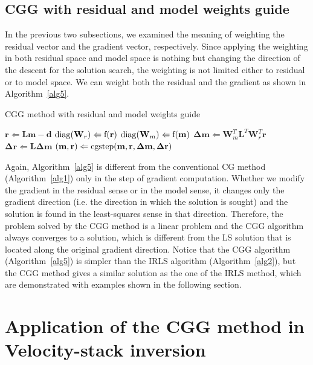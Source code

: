 \subsection{CGG with residual and model weights guide}
In the previous two subsections, we examined the meaning of weighting
the residual vector and the gradient vector, respectively.
Since applying the weighting in both residual space
and model space is nothing but changing the direction of the descent 
for the solution search, 
the weighting is not limited either to residual or to model space. 
We can weight both the residual and the gradient as shown in Algorithm~\ref{alg5}.

\begin{algorithm}
\caption{CGG method with residual and model weights guide}
\label{alg5}
\begin{algorithmic}
\STATE $ \mathbf r \Leftarrow \mathbf L \mathbf m - \mathbf d $
\STATE $ {\rm diag } (\mathbf W_r )\Leftarrow \rm f (\mathbf r) $
\STATE $ {\rm diag } (\mathbf W_m )\Leftarrow \rm f (\mathbf m) $
\STATE $ \mathbf \Delta \mathbf m \Leftarrow \mathbf W_m^T \mathbf L^T \mathbf W_r^T \mathbf r $
\STATE $ \mathbf \Delta \mathbf r \Leftarrow \mathbf L \mathbf \Delta \mathbf m $
\STATE $ (\mathbf m, \mathbf r) \Leftarrow \rm cgstep(\mathbf m, \mathbf r, \mathbf \Delta \mathbf m, \mathbf \Delta \mathbf r)  $
\ENDWHILE
\end{algorithmic}
\end{algorithm}

Again, Algorithm~\ref{alg5} is different from the conventional CG method (Algorithm~\ref{alg1})
only in the step of gradient computation.
Whether we modify the gradient in the residual sense 
or in the model sense, 
it changes only the gradient direction 
(i.e. the direction in which the solution is sought)
and the solution is found in the least-squares sense in that direction.
Therefore, the problem solved by the CGG method is a linear problem and 
the CGG algorithm always converges to a solution, which is different
from the LS solution that is located along the original gradient direction.
Notice that the CGG algorithm (Algorithm~\ref{alg5}) is simpler 
than the IRLS algorithm (Algorithm~\ref{alg2}),
but the CGG method gives a similar solution as the one of the IRLS method,
which are demonstrated with examples shown in the following section.

\section{Application of the CGG method in Velocity-stack inversion}

